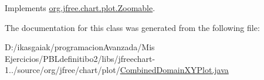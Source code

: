 Implements \mbox{\hyperlink{interfaceorg_1_1jfree_1_1chart_1_1plot_1_1_zoomable_a727d674650212288e299f6e32f498e07}{org.\+jfree.\+chart.\+plot.\+Zoomable}}.



The documentation for this class was generated from the following file\+:\begin{DoxyCompactItemize}
\item 
D\+:/ikasgaiak/programacion\+Avanzada/\+Mis Ejercicios/\+P\+B\+Ldefinitibo2/libs/jfreechart-\/1../source/org/jfree/chart/plot/\mbox{\hyperlink{_combined_domain_x_y_plot_8java}{Combined\+Domain\+X\+Y\+Plot.\+java}}\end{DoxyCompactItemize}
